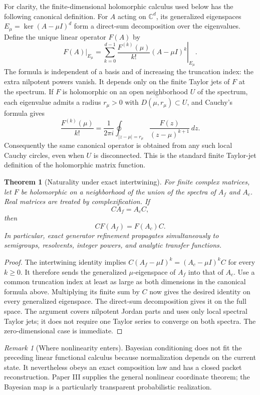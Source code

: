 \documentclass[11pt,letterpaper]{article}
\newtheorem{theorem}{Theorem}[section]
\theoremstyle{plain}
\theoremstyle{plain}
\theoremstyle{plain}
\theoremstyle{definition}
\theoremstyle{definition}
\theoremstyle{definition}
\theoremstyle{definition}
\theoremstyle{definition}
\theoremstyle{remark}
\theoremstyle{remark}
\newtheorem{remark}[remark]{Remark}
\theoremstyle{remark}
\theoremstyle{remark}
\theoremstyle{remark}
\theoremstyle{remark}
\let\KomorebiPrimitivemathbb\mathbb
\renewcommand{\mathbb}[1]{{\KomorebiPrimitivemathbb{#1}}}
\begin{document}
For clarity, the finite-dimensional holomorphic calculus used below has the
following canonical definition. For $A$ acting on $\mathbb C^d$, its generalized
eigenspaces $E_\mu=\ker(A-\mu I)^d$ form a direct-sum decomposition over the
eigenvalues. Define the unique linear operator $F(A)$ by
\[
\left.F(A)\right|_{E_\mu}
=\left.\sum_{k=0}^{d-1}\frac{F^{(k)}(\mu)}{k!}(A-\mu I)^k\right|_{E_\mu}.
\]
The formula is independent of a basis and of increasing the truncation index:
the extra nilpotent powers vanish. It depends only on the finite Taylor jets of
$F$ at the spectrum. If $F$ is holomorphic on an open neighborhood $U$ of the
spectrum, each eigenvalue admits a radius $r_\mu>0$ with
$\overline{D(\mu,r_\mu)}\subset U$, and Cauchy's formula gives
\[
\frac{F^{(k)}(\mu)}{k!}
=\frac{1}{2\pi i}\oint_{|z-\mu|=r_\mu}
  \frac{F(z)}{(z-\mu)^{k+1}}\,dz.
\]
Consequently the same canonical operator is obtained from any such local
Cauchy circles, even when $U$ is disconnected. This is the standard finite
Taylor-jet definition of the holomorphic matrix function.

\begin{theorem}[Naturality under exact intertwining]\label{core:record:044}
For finite complex matrices, let $F$ be holomorphic on a neighborhood of the union of the spectra of $A_f$ and $A_c$. Real matrices are treated by complexification. If
\[
CA_f=A_cC,
\]
then
\[
\boxed{CF(A_f)=F(A_c)C.}
\]
In particular, exact generator refinement propagates simultaneously to semigroups, resolvents, integer powers, and analytic transfer functions.
\end{theorem}

\begin{proof}
The intertwining identity implies
$C(A_f-\mu I)^k=(A_c-\mu I)^kC$ for every $k\ge0$.
It therefore sends the generalized $\mu$-eigenspace of $A_f$ into that of $A_c$.
Use a common truncation index at least as large as both dimensions in the
canonical formula above. Multiplying its finite sum by $C$ now gives the desired
identity on every generalized eigenspace. The direct-sum decomposition gives
it on the full space. The argument covers nilpotent Jordan parts and uses only
local spectral Taylor jets; it does not require one Taylor series to converge
on both spectra. The zero-dimensional case is immediate.
\end{proof}

\begin{remark}[Where nonlinearity enters]\label{core:record:045}
Bayesian conditioning does not fit the preceding linear functional calculus because normalization depends on the current state. It nevertheless obeys an exact composition law and has a closed packet reconstruction. Paper III supplies the general nonlinear coordinate theorem; the Bayesian map is a particularly transparent probabilistic realization.
\end{remark}
\end{document}
